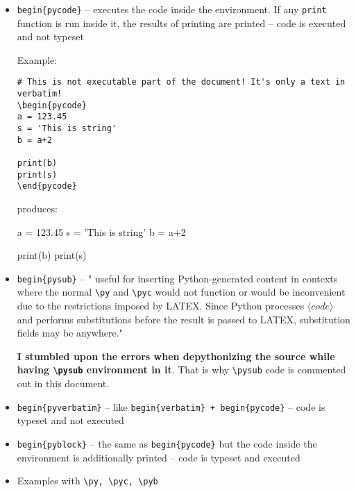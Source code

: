\documentclass[11pt]{article}
\begin{document}
\begin{itemize}

\item 
\verb|begin{pycode}| -- executes the code inside the environment. If any \verb|print| function is run inside it, the results of printing are printed 
-- code is executed and not typeset

Example:

\begin{verbatim}
# This is not executable part of the document! It's only a text in verbatim!
\begin{pycode}
a = 123.45
s = 'This is string'
b = a+2

print(b)
print(s)
\end{pycode}
\end{verbatim}

produces:

\begin{pycode}
a = 123.45
s = 'This is string'
b = a+2

print(b)
print(s)
\end{pycode}


\item 
\verb|begin{pysub}| -- " useful for inserting Python-generated content in contexts where the normal \verb|\py| and \verb|\pyc| would not function or would be inconvenient due to the restrictions imposed by LATEX. Since Python processes $\langle code \rangle$ and performs substitutions before the result is passed to LATEX, substitution fields may be anywhere."

{\bf I stumbled upon the errors when depythonizing the source while having \verb|\pysub| environment in it}. That is why \verb|\pysub| code is commented out in this document.

%
%

\item 
\verb|begin{pyverbatim}| -- like \verb|begin{verbatim} + begin{pycode}| -- code is typeset and not executed

\item 
\verb|begin{pyblock}| -- the same as \verb|begin{pycode}| but the code inside the environment is additionally printed 
-- code is typeset and executed

\item Examples with \verb|\py, \pyc, \pyb| 


\end{itemize}
\end{document}
